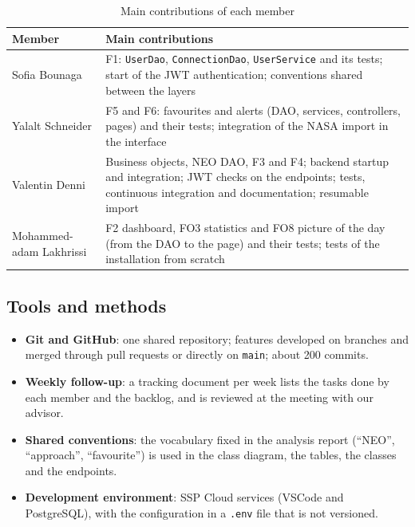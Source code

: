 \begin{table}[H]
\centering
\small
\begin{tabularx}{\textwidth}{l X}
\toprule
\textbf{Member} & \textbf{Main contributions} \\
\midrule
Sofia Bounaga & F1: \texttt{UserDao}, \texttt{ConnectionDao}, \texttt{UserService} and its tests; start of the JWT authentication; conventions shared between the layers \\
Yalalt Schneider & F5 and F6: favourites and alerts (DAO, services, controllers, pages) and their tests; integration of the NASA import in the interface \\
Valentin Denni & Business objects, NEO DAO, F3 and F4; backend startup and integration; JWT checks on the endpoints; tests, continuous integration and documentation; resumable import \\
Mohammed-adam Lakhrissi & F2 dashboard, FO3 statistics and FO8 picture of the day (from the DAO to the page) and their tests; tests of the installation from scratch \\
\bottomrule
\end{tabularx}
\caption{Main contributions of each member}
\label{tab:roles}
\end{table}

\subsection{Tools and methods}

\begin{itemize}
  \item \textbf{Git and GitHub}: one shared repository; features developed on branches and merged
  through pull requests or directly on \texttt{main}; about 200 commits.
  \item \textbf{Weekly follow-up}: a tracking document per week lists the tasks done by each
  member and the backlog, and is reviewed at the meeting with our advisor.
  \item \textbf{Shared conventions}: the vocabulary fixed in the analysis report (``NEO'',
  ``approach'', ``favourite'') is used in the class diagram, the tables, the classes and the
  endpoints.
  \item \textbf{Development environment}: SSP Cloud services (VSCode and PostgreSQL), with the
  configuration in a \texttt{.env} file that is not versioned.
\end{itemize}
